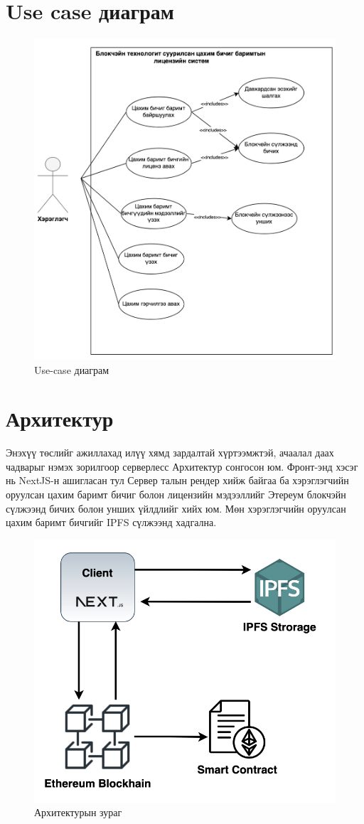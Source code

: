 \section{Use case диаграм}
\begin{figure}[h]
	\centering
	\includegraphics[scale=0.4]{src/images/usecase.png}
	\caption{Use-case диаграм}
\end{figure}


\section{Архитектур}
Энэхүү төслийг ажиллахад илүү хямд зардалтай хүртээмжтэй, ачаалал даах чадварыг
нэмэх зорилгоор серверлесс Архитектур сонгосон юм. Фронт-энд хэсэг нь NextJS-н ашигласан тул Сервер талын рендер хийж байгаа ба хэрэглэгчийн оруулсан цахим баримт бичиг болон лицензийн мэдээллийг Этереум блокчэйн сүлжээнд бичих болон унших үйлдлийг хийх юм. Мөн хэрэглэгчийн оруулсан цахим баримт бичгийг IPFS сүлжээнд хадгална.

\begin{figure}[h]
	\centering
	\includegraphics[scale=0.4]{src/images/architecture.png}
	\caption{Архитектурын зураг}
\end{figure}
